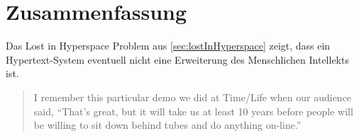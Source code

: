 \chapter{Zusammenfassung}
\label{ch:Zusammenfassung}

Das Lost in Hyperspace Problem aus \ref{sec:lostInHyperspace} zeigt, dass ein Hypertext-System eventuell nicht eine Erweiterung des Menschlichen Intellekts ist.

\begin{quote}
\glqq I remember this particular demo we did at Time/Life when our audience said, “That’s great, but it will take us at least 10 years before people will be willing to sit down behind tubes and do anything on-line.”\grqq{ }\cite{Dam1988}
\end{quote}